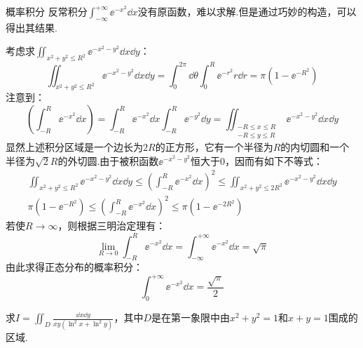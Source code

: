 \begin{extension}{概率积分}
    反常积分$\displaystyle\int_{-\infty}^{+\infty}\ee^{-x^2}\dd{x}$没有原函数，难以求解.但是通过巧妙的构造，可以得出其结果.
    
    考虑求$\displaystyle\iint_{x^2+y^2\leqslant R^2}\ee^{-x^2-y^2}\dd{x}\dd{y}$：
    \[\iint_{x^2+y^2\leqslant R^2}\ee^{-x^2-y^2}\dd{x}\dd{y} = \int_{0}^{2\pi}\dd{\theta}\int_{0}^{R}\ee^{-r^2}r\dd{r} = \pi\left(1-\ee^{-R^2}\right)\]
    注意到：
    \[\left(\int_{-R}^{R}\ee^{-x^2}\dd{x}\right) = \int_{-R}^{R}\ee^{-x^2}\dd{x}\int_{-R}^{R}\ee^{-y^2}\dd{y} = \iint_{\,\substack{-R\leqslant x \leqslant R \\ -R\leqslant y \leqslant R}}\ee^{-x^2-y^2}\dd{x}\dd{y}\]
    显然上述积分区域是一个边长为$2R$的正方形，它有一个半径为$R$的内切圆和一个半径为$\sqrt{2}R$的外切圆.由于被积函数$\ee^{-x^2-y^2}$恒大于$0$，因而有如下不等式：
    \begin{gather*}
        \iint_{x^2+y^2\leqslant R^2}\ee^{-x^2-y^2}\dd{x}\dd{y} \leqslant \left(\int_{-R}^{R}\ee^{-x^2}\dd{x}\right)^2 \leqslant \iint_{x^2+y^2\leqslant 2R^2}\ee^{-x^2-y^2}\dd{x}\dd{y} \\
        \pi\left(1-\ee^{-R^2}\right) \leqslant \left(\int_{-R}^{R}\ee^{-x^2}\dd{x}\right)^2 \leqslant \pi\left(1-\ee^{-2R^2}\right)
    \end{gather*}
    若使$R \to \infty$，则根据三明治定理有：
    \[\lim_{R \to 0}\int_{-R}^{R}\ee^{-x^2}\dd{x} = \int_{-\infty}^{+\infty}\ee^{-x^2}\dd{x} = \sqrt{\pi}\]
    由此求得正态分布的概率积分：
    \[\int_{0}^{+\infty}\ee^{-x^2}\dd{x} = \frac{\sqrt{\pi}}{2}\]
\end{extension}

\begin{question}
    求$\displaystyle I = \iint_D\frac{\dd{x}\dd{y}}{xy(\ln^2 x + \ln^2 y)}$，其中$D$是在第一象限中由$x^2+y^2 = 1$和$x + y = 1$围成的区域.
\end{question}


